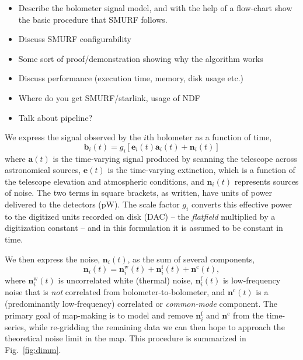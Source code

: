 \documentclass[useAMS,usenatbib,nofootinbib]{mn2e}
\begin{document}
\begin{itemize}

\item Describe the bolometer signal model, and with the help of a flow-chart
show the basic procedure that SMURF follows.

\item Discuss SMURF configurability

\item Some sort of proof/demonstration showing why the algorithm works

\item Discuss performance (execution time, memory, disk usage etc.)

\item Where do you get SMURF/starlink, usage of NDF

\item Talk about pipeline?

\end{itemize}

We express the signal observed by the $i$th bolometer as a function of time,
\begin{equation}
\mathbf{b}_i(t) = g_i[\mathbf{e}_i(t) \mathbf{a}_i(t) + \mathbf{n}_i(t)]
\end{equation}
where $\mathbf{a}(t)$ is the time-varying signal produced by scanning
the telescope across astronomical sources, $\mathbf{e}(t)$ is the
time-varying extinction, which is a function of the telescope
elevation and atmospheric conditions, and $\mathbf{n}_i(t)$ represents
sources of noise. The two terms in square brackets, as written, have
units of power delivered to the detectors (pW). The scale factor $g_i$
converts this effective power to the digitized units recorded on disk
(DAC) -- the \emph{flatfield} multiplied by a digitization constant --
and in this formulation it is assumed to be constant in time.

We then express the noise, $\mathbf{n}_i(t)$, as the sum of several
components,
%
\begin{equation}
  \mathbf{n}_i(t) = \mathbf{n}^\mathrm{w}_i(t) + \mathbf{n}^\mathrm{f}_i(t) +
  \mathbf{n}^\mathrm{c}(t),
\end{equation}
%
where $\mathbf{n}^\mathrm{w}_i(t)$ is uncorrelated white (thermal)
noise, $\mathbf{n}^\mathrm{f}_i(t)$ is low-frequency noise that is
\emph{not} correlated from bolometer-to-bolometer, and
$\mathbf{n}^\mathrm{c}(t)$ is a (predominantly low-frequency)
correlated or \emph{common-mode} component. The primary goal of
map-making is to model and remove $\mathbf{n}^\mathrm{f}_i$ and
$\mathbf{n}^\mathrm{c}$ from the time-series, while re-gridding the
remaining data we can then hope to approach the theoretical noise
limit in the map. This procedure is summarized in Fig.~\ref{fig:dimm}.
\end{document}
